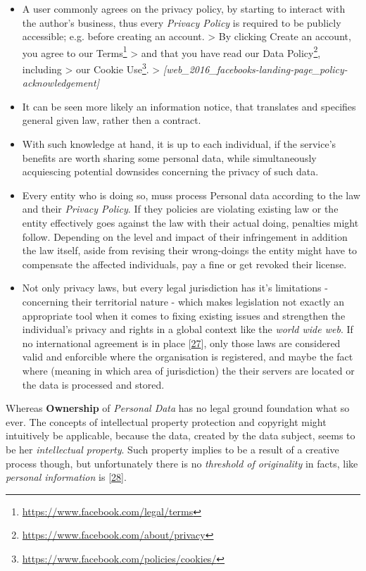 \documentclass[12pt,english,a4paper,titlepage,cleardoublepage=empty,dottedtoc]{report}
\renewcommand{\href}[2]{#2\footnote{\url{#1}}}
\begin{document}
\begin{itemize}
\item
  A user commonly agrees on the privacy policy, by starting to interact
  with the author's business, thus every \emph{Privacy Policy} is
  required to be publicly accessible; e.g. before creating an account.
  \textgreater{} By clicking Create an account, you agree to our
  \href{https://www.facebook.com/legal/terms}{Terms} \textgreater{} and
  that you have read our
  \href{https://www.facebook.com/about/privacy}{Data Policy}, including
  \textgreater{} our
  \href{https://www.facebook.com/policies/cookies/}{Cookie Use}.
  \textgreater{}
  \emph{{[}web\_2016\_facebooks-landing-page\_policy-acknowledgement{]}}
\item
  It can be seen more likely an information notice, that translates and
  specifies general given law, rather then a contract.
\item
  With such knowledge at hand, it is up to each individual, if the
  service's benefits are worth sharing some personal data, while
  simultaneously acquiescing potential downsides concerning the privacy
  of such data.
\item
  Every entity who is doing so, muss process Personal data according to
  the law and their \emph{Privacy Policy}. If they policies are
  violating existing law or the entity effectively goes against the law
  with their actual doing, penalties might follow. Depending on the
  level and impact of their infringement in addition the law itself,
  aside from revising their wrong-doings the entity might have to
  compensate the affected individuals, pay a fine or get revoked their
  license.
\item
  Not only privacy laws, but every legal jurisdiction has it's
  limitations - concerning their territorial nature - which makes
  legislation not exactly an appropriate tool when it comes to fixing
  existing issues and strengthen the individual's privacy and rights in
  a global context like the \emph{world wide web}. If no international
  agreement is in place
  {[}\protect\hyperlink{ref-web_2016_international-privacy-standards}{27}{]},
  only those laws are considered valid and enforcible where the
  organisation is registered, and maybe the fact where (meaning in which
  area of jurisdiction) the their servers are located or the data is
  processed and stored.
\end{itemize}

Whereas \textbf{Ownership} of \emph{Personal Data} has no legal ground
foundation what so ever. The concepts of intellectual property
protection and copyright might intuitively be applicable, because the
data, created by the data subject, seems to be her \emph{intellectual
property}. Such property implies to be a result of a creative process
though, but unfortunately there is no \emph{threshold of originality} in
facts, like \emph{personal information} is
{[}\protect\hyperlink{ref-paper_2014_who-owns-yours-data}{28}{]}.
\end{document}
